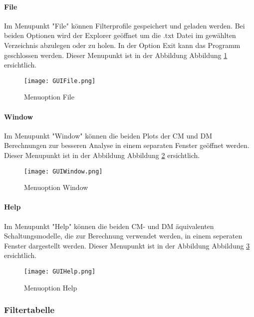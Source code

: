 \paragraph{File} \label{para:file}
Im Menupunkt "File" können Filterprofile gespeichert und geladen werden. Bei beiden Optionen wird der Explorer geöffnet um die .txt Datei im gewählten Verzeichnis abzulegen oder zu holen. In der Option Exit kann das Programm geschlossen werden. Dieser Menupunkt ist in der Abbildung Abbildung \ref{fig:GUIFile}  ersichtlich.

\begin{figure}[H]
	\centering
	\texttt{[image: GUIFile.png]}
	\caption{Menuoption File}
	\label{fig:GUIFile}
\end{figure}

\bigskip

\paragraph{Window} \label{para:window}
Im Menupunkt "Window" können die beiden Plots der CM und DM Berechnungen zur besseren Analyse in einem separaten  Fenster geöffnet werden. Dieser Menupunkt ist in der Abbildung Abbildung \ref{fig:GUIWindow}  ersichtlich.

\begin{figure}[H]
	\centering
	\texttt{[image: GUIWindow.png]}
	\caption{Menuoption Window}
	\label{fig:GUIWindow}
\end{figure}

\bigskip

\paragraph{Help} \label{para:window}
Im Menupunkt "Help" können die beiden CM- und DM äquivalenten Schaltungsmodelle, die zur Berechnung verwendet werden, in einem seperaten Fenster dargestellt werden. Dieser Menupunkt ist in der Abbildung Abbildung \ref{fig:GUIHelp}  ersichtlich.

\begin{figure}[H]
	\centering
	\texttt{[image: GUIHelp.png]}
	\caption{Menuoption Help}
	\label{fig:GUIHelp}
\end{figure}

\newpage

\subsubsection{Filtertabelle} \label{subsubsec:filtertabelle}

